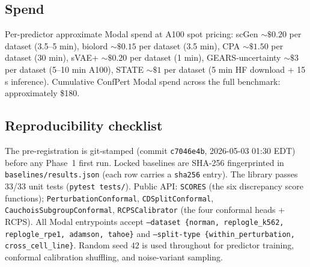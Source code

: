 \documentclass{article}
\begin{document}
\subsection{Spend}
Per-predictor approximate Modal spend at A100 spot pricing: scGen $\sim\$0.20$ per dataset (3.5--5 min), biolord $\sim\$0.15$ per dataset (3.5 min), CPA $\sim\$1.50$ per dataset (30 min), sVAE+ $\sim\$0.20$ per dataset (1 min), GEARS-uncertainty $\sim\$3$ per dataset (5--10 min A100), STATE $\sim\$1$ per dataset (5 min HF download + 15 s inference). Cumulative ConfPert Modal spend across the full benchmark: approximately \$180.

\subsection{Reproducibility checklist}
The pre-registration is git-stamped (commit \texttt{c7046e4b}, 2026-05-03 01:30 EDT) before any Phase~1 first run. Locked baselines are SHA-256 fingerprinted in \texttt{baselines/results.json} (each row carries a \texttt{sha256} entry). The library passes 33/33 unit tests (\texttt{pytest tests/}). Public API: \texttt{SCORES} (the six discrepancy score functions); \texttt{PerturbationConformal}, \texttt{CDSplitConformal}, \texttt{CauchoisSubgroupConformal}, \texttt{RCPSCalibrator} (the four conformal heads + RCPS). All Modal entrypoints accept \texttt{--dataset \{norman, replogle\_k562, replogle\_rpe1, adamson, tahoe\}} and \texttt{--split-type \{within\_perturbation, cross\_cell\_line\}}. Random seed $42$ is used throughout for predictor training, conformal calibration shuffling, and noise-variant sampling.
\end{document}
